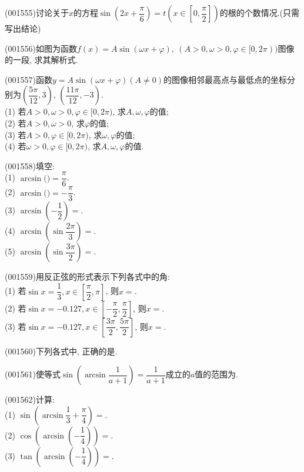\item (001555)讨论关于$x$的方程$\sin (2x+\dfrac{\pi}{6})=t(x\in[0, \dfrac{\pi}{2}])$的根的个数情况.(只需写出结论)
\item (001556)如图为函数$f(x)=A\sin (\omega x+\varphi), \ (A>0,\omega>0,\varphi\in [0,2\pi))$图像的一段, 求其解析式.
\item (001557)函数$y=A\sin(\omega x+\varphi)(A\neq 0)$的图像相邻最高点与最低点的坐标分别为$\left(\dfrac{5\pi}{12},3\right)$, $\left(\dfrac{11\pi}{12},-3\right)$.\\ 
(1) 若$A>0, \omega>0, \varphi\in [0,2\pi)$, 求$A, \omega, \varphi$的值;\\ 
(2) 若$A>0, \omega>0$, 求$\varphi$的值;\\ 
(3) 若$A>0, \varphi\in [0,2\pi)$, 求$\omega, \varphi$的值;\\ 
(4) 若$\omega>0, \varphi\in [0,2\pi)$, 求$A, \omega, \varphi$的值.
\item (001558)填空:\\ 
(1) $\arcsin($$)=\dfrac{\pi}{6}$.\\ 
(2) $\arcsin($$)=-\dfrac{\pi}{3}$.\\ 
(3) $\arcsin \left(-\dfrac{1}{2}\right)=$.\\ 
(4) $\arcsin \left(\sin \dfrac{2\pi}{3}\right)=$.\\ 
(5) $\arcsin\left(\sin \dfrac{3\pi}{2}\right)=$.
\item (001559)用反正弦的形式表示下列各式中的角:\\ 
(1) 若$\sin x=\dfrac{1}{3},x\in[\dfrac{\pi}{2},\pi]$, 则$x=$.\\ 
(2) 若$\sin x=-0.127,x\in[-\dfrac{\pi}{2},\dfrac{\pi}{2}]$, 则$x=$.\\ 
(3) 若$\sin x=-0.127,x\in[\dfrac{3\pi}{2},\dfrac{5\pi}{2}]$, 则$x=$.
\item (001560)下列各式中, 正确的是.
\item (001561)使等式$\sin\left(\arcsin\dfrac{1}{a+1}\right)=\dfrac{1}{a+1}$成立的$a$值的范围为.
\item (001562)计算:\\ 
(1) $\sin\left(\arcsin \dfrac{1}{3}+\dfrac{\pi}{4}\right)=$.\\ 
(2) $\cos\left(\arcsin\left(-\dfrac{1}{4}\right)\right)=$.\\ 
(3) $\tan \left(\arcsin\left(-\dfrac{1}{4}\right)\right)=$.\\ 

